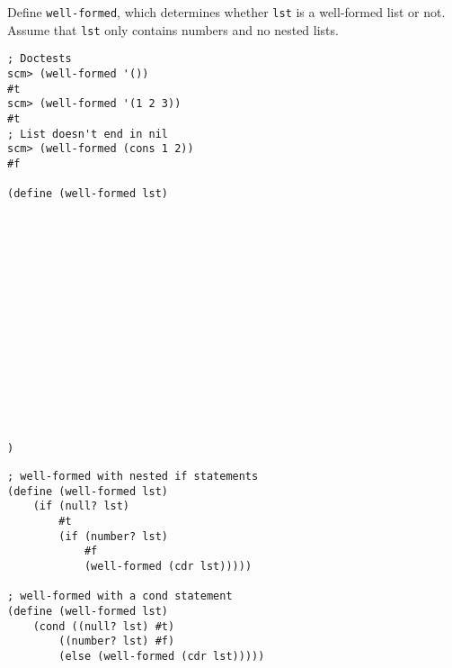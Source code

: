 \begin{blocksection}
\question Define \lstinline$well-formed$, which determines whether \lstinline$lst$ is a well-formed list or not. Assume that \lstinline$lst$ only contains numbers
and no nested lists.

\begin{lstlisting}
; Doctests
scm> (well-formed '())
#t
scm> (well-formed '(1 2 3))
#t
; List doesn't end in nil
scm> (well-formed (cons 1 2))
#f

(define (well-formed lst)
    















)
\end{lstlisting}
\end{blocksection}
\begin{blocksection}
\newpage
\begin{solution}[1.5in]
\begin{lstlisting}
; well-formed with nested if statements
(define (well-formed lst)
    (if (null? lst)
        #t
        (if (number? lst)
            #f
            (well-formed (cdr lst)))))

; well-formed with a cond statement
(define (well-formed lst)
    (cond ((null? lst) #t)
        ((number? lst) #f)
        (else (well-formed (cdr lst)))))
\end{lstlisting}
\end{solution}
\end{blocksection}
